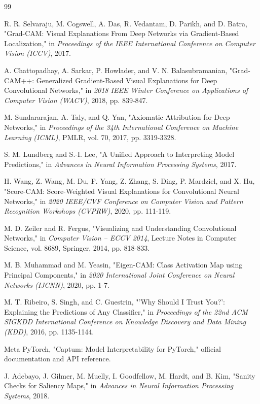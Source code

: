\begin{thebibliography}{99}
 R. R. Selvaraju, M. Cogswell, A. Das, R. Vedantam, D. Parikh, and D. Batra, "Grad-CAM: Visual Explanations From Deep Networks via Gradient-Based Localization," in \emph{Proceedings of the IEEE International Conference on Computer Vision (ICCV)}, 2017.

 A. Chattopadhay, A. Sarkar, P. Howlader, and V. N. Balasubramanian, "Grad-CAM++: Generalized Gradient-Based Visual Explanations for Deep Convolutional Networks," in \emph{2018 IEEE Winter Conference on Applications of Computer Vision (WACV)}, 2018, pp. 839-847.

 M. Sundararajan, A. Taly, and Q. Yan, "Axiomatic Attribution for Deep Networks," in \emph{Proceedings of the 34th International Conference on Machine Learning (ICML)}, PMLR, vol. 70, 2017, pp. 3319-3328.

 S. M. Lundberg and S.-I. Lee, "A Unified Approach to Interpreting Model Predictions," in \emph{Advances in Neural Information Processing Systems}, 2017.

 H. Wang, Z. Wang, M. Du, F. Yang, Z. Zhang, S. Ding, P. Mardziel, and X. Hu, "Score-CAM: Score-Weighted Visual Explanations for Convolutional Neural Networks," in \emph{2020 IEEE/CVF Conference on Computer Vision and Pattern Recognition Workshops (CVPRW)}, 2020, pp. 111-119.

 M. D. Zeiler and R. Fergus, "Visualizing and Understanding Convolutional Networks," in \emph{Computer Vision -- ECCV 2014}, Lecture Notes in Computer Science, vol. 8689, Springer, 2014, pp. 818-833.

 M. B. Muhammad and M. Yeasin, "Eigen-CAM: Class Activation Map using Principal Components," in \emph{2020 International Joint Conference on Neural Networks (IJCNN)}, 2020, pp. 1-7.

 M. T. Ribeiro, S. Singh, and C. Guestrin, "'Why Should I Trust You?': Explaining the Predictions of Any Classifier," in \emph{Proceedings of the 22nd ACM SIGKDD International Conference on Knowledge Discovery and Data Mining (KDD)}, 2016, pp. 1135-1144.

 Meta PyTorch, "Captum: Model Interpretability for PyTorch," official documentation and API reference.

 J. Adebayo, J. Gilmer, M. Muelly, I. Goodfellow, M. Hardt, and B. Kim, "Sanity Checks for Saliency Maps," in \emph{Advances in Neural Information Processing Systems}, 2018.


\end{thebibliography}
